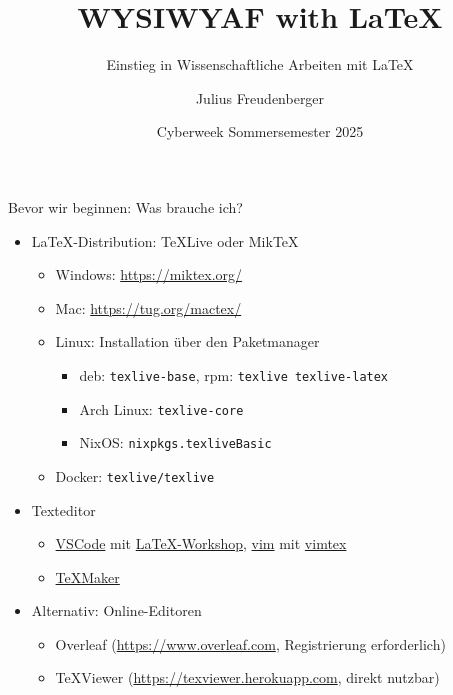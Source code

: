 \documentclass[presentation,aspectratio=169]{beamer}
\author{Julius Freudenberger}
\date{Cyberweek Sommersemester 2025}
\title{WYSIWYAF with \LaTeX}
\subtitle{Einstieg in Wissenschaftliche Arbeiten mit \LaTeX}
\institute[Hochschule Esslingen]{Hochschule Esslingen}
\begin{document}
\maketitle

\begin{frame}[fragile]{Bevor wir beginnen: Was brauche ich?}
  \begin{itemize}
    \item \LaTeX-Distribution: \TeX{}Live oder Mik\TeX{}
      \begin{itemize}
        \item Windows: \href{https://miktex.org/}{https://miktex.org/}
        \item Mac: \href{https://tug.org/mactex/}{https://tug.org/mactex/}
        \item Linux: Installation über den Paketmanager
          \begin{itemize}
            \item deb: \verb|texlive-base|, rpm: \verb|texlive texlive-latex|
            \item Arch Linux: \verb|texlive-core|
            \item NixOS: \verb|nixpkgs.texliveBasic|
          \end{itemize}
        \item Docker: \verb|texlive/texlive|
      \end{itemize}
    \item Texteditor
      \begin{itemize}
        \item \href{https://code.visualstudio.com/}{VSCode} mit \href{https://marketplace.visualstudio.com/items?itemName=James-Yu.latex-workshop}{\LaTeX-Workshop}, \href{https://www.vim.org/}{vim} mit \href{https://github.com/lervag/vimtex}{vimtex}
        \item \href{https://www.xm1math.net/texmaker/index.html}{\TeX{}Maker}
      \end{itemize}
    \item Alternativ: Online-Editoren
      \begin{itemize}
        \item Overleaf (\href{https://www.overleaf.com}{https://www.overleaf.com}, Registrierung erforderlich)
        \item \TeX{}Viewer (\href{https://texviewer.herokuapp.com}{https://texviewer.herokuapp.com}, direkt nutzbar)
      \end{itemize}
  \end{itemize}
\end{frame}
\end{document}
